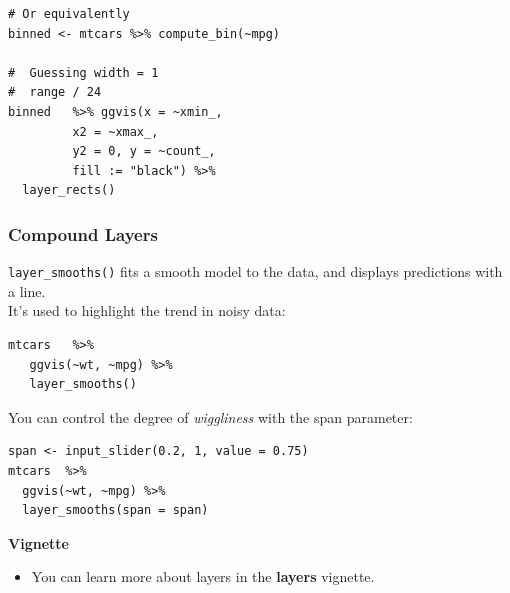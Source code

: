 \documentclass[MASTER.tex]{subfiles}
\begin{document}
\begin{frame}[fragile]
	\begin{framed}
		\begin{verbatim}
# Or equivalently
binned <- mtcars %>% compute_bin(~mpg) 

#  Guessing width = 1 
#  range / 24
binned   %>% ggvis(x = ~xmin_, 
         x2 = ~xmax_, 
         y2 = 0, y = ~count_, 
         fill := "black") %>% 
  layer_rects()
\end{verbatim}
\end{framed}
\end{frame}
\begin{frame}[fragile]
\frametitle{Compound Layers}
\Large
\texttt{layer\_smooths()} fits a smooth model to the data, and displays predictions with a line. \\ It’s used to highlight the trend in noisy data:
\begin{framed}
\begin{verbatim}
mtcars   %>% 
   ggvis(~wt, ~mpg) %>% 
   layer_smooths()
\end{verbatim}
\end{framed}
\end{frame}
\begin{frame}[fragile]
\large
You can control the degree of \textit{wiggliness} with the span parameter:
	\begin{framed}
		\begin{verbatim}
span <- input_slider(0.2, 1, value = 0.75)
mtcars  %>% 
  ggvis(~wt, ~mpg) %>% 
  layer_smooths(span = span)

\end{verbatim}
\end{framed}
\end{frame}
\begin{frame}[fragile]
\Large
\textbf{Vignette}
\begin{itemize}
\item You can learn more about layers in the \textbf{layers} vignette.
\end{itemize}
\end{frame}
\end{document}

